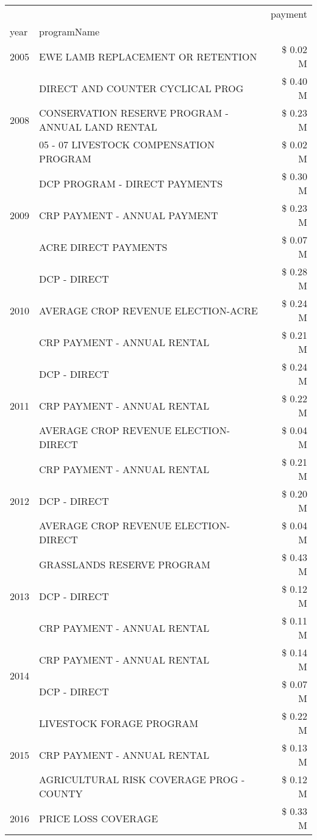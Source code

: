 \begin{tabular}{llr}
\toprule
 &  & payment \\
year & programName &  \\
\midrule
2005 & EWE LAMB REPLACEMENT OR RETENTION & \$ 0.02 M \\
\cline{1-3}
\multirow[t]{3}{*}{2008} & DIRECT AND COUNTER CYCLICAL PROG & \$ 0.40 M \\
 & CONSERVATION RESERVE PROGRAM - ANNUAL LAND RENTAL & \$ 0.23 M \\
 & 05 - 07 LIVESTOCK COMPENSATION PROGRAM & \$ 0.02 M \\
\cline{1-3}
\multirow[t]{3}{*}{2009} & DCP PROGRAM - DIRECT PAYMENTS & \$ 0.30 M \\
 & CRP PAYMENT - ANNUAL PAYMENT & \$ 0.23 M \\
 & ACRE DIRECT PAYMENTS & \$ 0.07 M \\
\cline{1-3}
\multirow[t]{3}{*}{2010} & DCP - DIRECT & \$ 0.28 M \\
 & AVERAGE CROP REVENUE ELECTION-ACRE & \$ 0.24 M \\
 & CRP PAYMENT - ANNUAL RENTAL & \$ 0.21 M \\
\cline{1-3}
\multirow[t]{3}{*}{2011} & DCP - DIRECT & \$ 0.24 M \\
 & CRP PAYMENT - ANNUAL RENTAL & \$ 0.22 M \\
 & AVERAGE CROP REVENUE ELECTION-DIRECT & \$ 0.04 M \\
\cline{1-3}
\multirow[t]{3}{*}{2012} & CRP PAYMENT - ANNUAL RENTAL & \$ 0.21 M \\
 & DCP - DIRECT & \$ 0.20 M \\
 & AVERAGE CROP REVENUE ELECTION-DIRECT & \$ 0.04 M \\
\cline{1-3}
\multirow[t]{3}{*}{2013} & GRASSLANDS RESERVE PROGRAM & \$ 0.43 M \\
 & DCP - DIRECT & \$ 0.12 M \\
 & CRP PAYMENT - ANNUAL RENTAL & \$ 0.11 M \\
\cline{1-3}
\multirow[t]{2}{*}{2014} & CRP PAYMENT - ANNUAL RENTAL & \$ 0.14 M \\
 & DCP - DIRECT & \$ 0.07 M \\
\cline{1-3}
\multirow[t]{3}{*}{2015} & LIVESTOCK FORAGE PROGRAM & \$ 0.22 M \\
 & CRP PAYMENT - ANNUAL RENTAL & \$ 0.13 M \\
 & AGRICULTURAL RISK COVERAGE PROG - COUNTY & \$ 0.12 M \\
\cline{1-3}
\multirow[t]{3}{*}{2016} & PRICE LOSS COVERAGE & \$ 0.33 M \\

\end{tabular}
